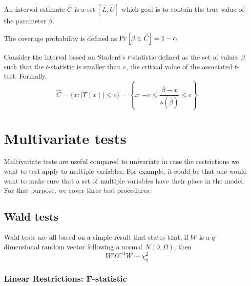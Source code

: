 \begin{definition}
An interval estimate $\hat C$ is a set $\left[\hat L, \hat U\right]$ which goal is to contain the true value of the parameter $\beta$. 
\end{definition}

\begin{definition}
The coverage probability is defined as $\operatorname{Pr}\left[\beta\in\hat C\right] = 1 -\alpha $
\end{definition}

\begin{proposition}
Consider the interval based on Student's $t$-statistic defined as the set of values $\beta$ such that the $t$-statistic is smaller than $c$, the critical value of the associated $t$-test. Formally, $$\hat C = \{x : \vert T(x)\vert \leq c\} = \left\lbrace x : -c\leq \frac{\hat{\beta} - x}{s(\hat\beta)} \leq c\right\rbrace $$
\end{proposition}

\section{Multivariate tests}

Multivariate tests are useful compared to univariate in case the restrictions we want to test apply to multiple variables. For example, it could be that one would want to make sure that a set of multiple variables have their place in the model. For that purpose, we cover three test procedures:

\subsection{Wald tests}

Wald tests are all based on a simple result that states that, if $W$ is a $q$-dimensional random vector following a normal $N(0, \Omega)$, then $$ W'\Omega^{-1} W \sim \chi_q^2 $$

\subsubsection{Linear Restrictions: F-statistic}

